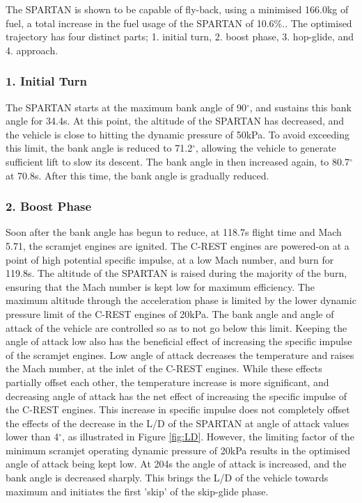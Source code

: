 \documentclass{article}
\begin{document}
The SPARTAN is shown to be capable of fly-back, using a minimised 166.0kg of fuel, a total increase in the fuel usage of the SPARTAN of 10.6\%..
The optimised trajectory has four distinct parts; 1. initial turn, 2. boost phase, 3. hop-glide, and 4. approach. 

\subsubsection{1. Initial Turn}
The SPARTAN starts at the maximum bank angle of 90$^\circ$, and sustains this bank angle for 34.4s. At this point, the altitude of the SPARTAN has decreased, and the vehicle is close to hitting the dynamic pressure of 50kPa. To avoid exceeding this limit, the bank angle is reduced to 71.2$^\circ$, allowing the vehicle to generate sufficient lift to slow its descent. The bank angle in then increased again, to 80.7$^\circ$ at 70.8s. After this time, the bank angle is gradually reduced. 

\subsubsection{2. Boost Phase}
Soon after the bank angle has begun to reduce, at 118.7s flight time and Mach 5.71, the scramjet engines are ignited. The C-REST engines are powered-on at a point of high potential specific impulse, at a low Mach number, and burn for 119.8s. The altitude of the SPARTAN is raised during the majority of the burn, ensuring that the Mach number is kept low for maximum efficiency\cite{Preller2017}. The maximum altitude through the acceleration phase is limited by the lower dynamic pressure limit of the C-REST engines of 20kPa. The bank angle and angle of attack of the vehicle are controlled so as to not go below this limit. Keeping the angle of attack low also has the beneficial effect of increasing the specific impulse of the scramjet engines. Low angle of attack decreases the temperature and raises the Mach number, at the inlet of the C-REST engines. While these effects partially offset each other\cite{Preller2017}, the temperature increase is more significant, and decreasing angle of attack has the net effect of increasing the specific impulse of the C-REST engines. This increase in specific impulse does not completely offset the effects of the decrease in the L/D of the SPARTAN at angle of attack values lower than 4$^\circ$, as illustrated in Figure \ref{fig:LD}. However, the limiting factor of the minimum scramjet operating dynamic pressure of 20kPa results in the optimised angle of attack being kept low. At 204s the angle of attack is increased, and the bank angle is decreased sharply. This brings the L/D of the vehicle towards maximum and initiates the first 'skip' of the skip-glide phase.  
\end{document}
